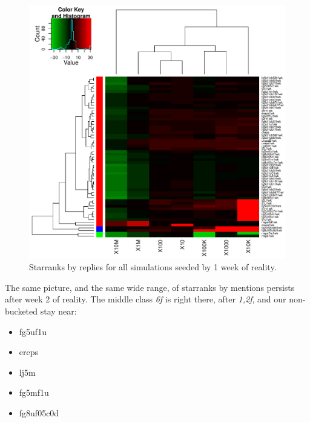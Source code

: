 \documentclass[10pt,oneside]{memoir}
\begin{document}
\begin{Spacing}{2}
\begin{figure}
\begin{center}
    \includegraphics{figures/crop/heatmap-sbucks-reps-star-med-medians-1wk}
    \caption{Starranks by replies for all simulations seeded by 1 week of reality.}
    \label{figure:heatmap-sbucks-reps-star-med-medians-1wk}
\end{center}
\end{figure}
The same picture, and the same wide range, of starranks by mentions persists after week 2 of reality.  The middle class {\itshape 6f} is right there, after {\itshape {1,2}f}, and our non-bucketed stay near:


\begin{itemize}


\item fg5uf1u

\item ereps

\item lj5m

\item fg5mf1u

\item fg8uf05c0d
\end{itemize}



\end{Spacing}
\end{document}
